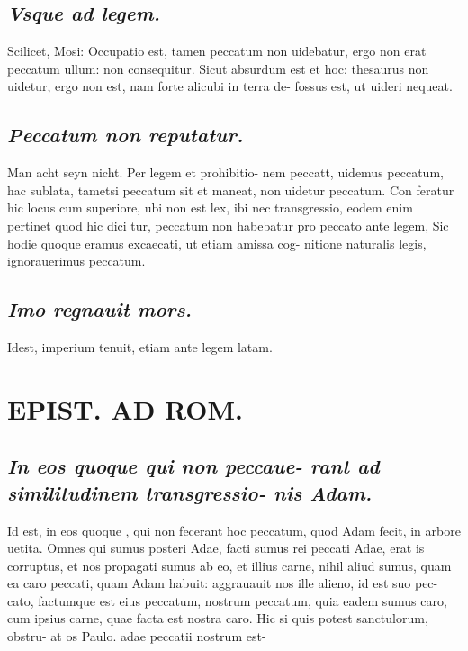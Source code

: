 \documentclass{article}
\begin{document}
\begin{pages}
\subsection*{\textit{Vsque ad legem. }}\pstart Scilicet, Mosi: Occupatio est, tamen peccatum non uidebatur, ergo non erat peccatum ullum: non consequitur. Sicut absurdum est et hoc: thesaurus non uidetur, ergo non est, nam forte alicubi in terra de- fossus est, ut uideri nequeat.   \pend
{}
{}
\subsection*{\textit{Peccatum non reputatur. }}\pstart Man acht seyn nicht. Per legem et prohibitio- nem peccatt, uidemus peccatum, hac sublata, tametsi peccatum sit et maneat, non uidetur peccatum. Con feratur hic locus cum superiore, ubi non est lex, ibi nec transgressio, eodem enim pertinet quod hic dici tur, peccatum non habebatur pro peccato ante legem, Sic hodie quoque eramus excaecati, ut etiam amissa cog- nitione naturalis legis, ignorauerimus peccatum.   \pend
{}
{}
\subsection*{\textit{Imo regnauit mors. }}\pstart Idest, imperium tenuit, etiam ante legem latam.   \pend
\section*{EPIST. AD ROM.  }
\marginpar{[ p.53 ]}
{}
\subsection*{\textit{In eos quoque qui non peccaue- rant ad similitudinem transgressio- nis Adam. }}\pstart Id est, in eos quoque , qui non fecerant hoc peccatum, quod Adam fecit, in arbore uetita. Omnes qui sumus posteri Adae, facti sumus rei peccati Adae, erat is corruptus, et nos propagati sumus ab eo, et illius carne, nihil aliud sumus, quam ea caro peccati, quam Adam habuit: aggrauauit nos ille alieno, id est suo pec- cato, factumque est eius peccatum, nostrum peccatum, quia eadem sumus caro, cum ipsius carne, quae facta est nostra caro. Hic si quis potest sanctulorum, obstru- at os Paulo.  adae peccatii nostrum est-  \pend
{}
{}

\end{pages}
\end{document}
